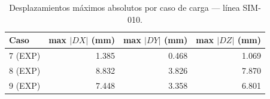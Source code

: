 \begin{table}[htbp]
  \centering
  \small
  \caption{Desplazamientos máximos absolutos por caso de carga — línea SIM-010.}
  \label{tab:desplaz-max}
  \begin{tabular}{lrrr}
    \toprule
    Caso & max $|DX|$ (\si{mm}) & max $|DY|$ (\si{mm}) & max $|DZ|$ (\si{mm}) \\
    \midrule
    7 (EXP) & 1.385 & 0.468 & 1.069 \\
    8 (EXP) & 8.832 & 3.826 & 7.870 \\
    9 (EXP) & 7.448 & 3.358 & 6.801 \\
    \bottomrule
  \end{tabular}
\end{table}
